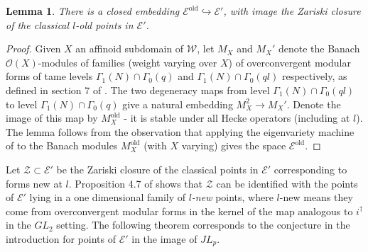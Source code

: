 \documentclass[a4paper, notitlepage]{amsart}
\newcommand{\OO}{\ensuremath{\mathscr{O}}\xspace}
\newtheorem{lemma}[theorem]{Lemma}
\begin{document}
\begin{lemma}\label{OLD}
There is a closed embedding $\mathscr{E}^{\mathrm{old}}\hookrightarrow \mathscr{E}'$, with image the Zariski closure of the classical $l$-old points in $\mathscr{E}'$.
\end{lemma}
\begin{proof}
Given $X$ an affinoid subdomain of $\mathscr{W}$, let $M_X$ and $M_X'$ denote the Banach $\OO(X)$-modules of families (weight varying over $X$) of overconvergent modular forms of tame levels $\Gamma_1(N)\cap\Gamma_0(q)$ and $\Gamma_1(N)\cap\Gamma_0(ql)$ respectively, as defined in section 7 of \cite{Bu2}. The two degeneracy maps from level $\Gamma_1(N)\cap\Gamma_0(ql)$ to level $\Gamma_1(N)\cap\Gamma_0(q)$ give a natural embedding $M_X^2 \rightarrow M_X'$. Denote the image of this map by $M_X^\mathrm{old}$ - it is stable under all Hecke operators (including at $l$). The lemma follows from the observation that applying the eigenvariety machine of \cite{Bu2} to the Banach modules $M_X^\mathrm{old}$ (with $X$ varying) gives the space $\mathscr{E}^{\mathrm{old}}$. 
\end{proof}

Let $\mathscr{Z}\subset \mathscr{E}'$ be the Zariski closure of the classical points in $\mathscr{E}'$ corresponding to forms new at $l$. Proposition 4.7 of \cite{MR2111512} shows that $\mathscr{Z}$ can be identified with the points of $\mathscr{E}'$ lying in a one dimensional family of \emph{$l$-new} points, where $l$-new means they come from overconvergent modular forms in the kernel of the map analogous to $i^\dagger$ in the $GL_2$ setting. The following theorem corresponds to the conjecture in the introduction for points of $\mathscr{E}'$ in the image of $JL_p$.
\end{document}
